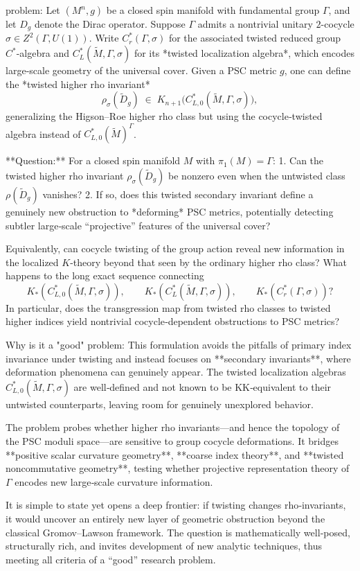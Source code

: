 problem:  
Let \( (M^n,g) \) be a closed spin manifold with fundamental group \( \Gamma \), and let \( D_g \) denote the Dirac operator. Suppose \( \Gamma \) admits a nontrivial unitary \( 2 \)-cocycle \( \sigma \in Z^2(\Gamma,U(1)) \). Write \( C^*_r(\Gamma,\sigma) \) for the associated twisted reduced group \( C^*\)-algebra and \( C^*_L(\widetilde M,\Gamma,\sigma) \) for its *twisted localization algebra*, which encodes large‑scale geometry of the universal cover.  
Given a PSC metric \(g\), one can define the *twisted higher rho invariant*  
\[
\rho_\sigma(\widetilde D_g) \;\in\; K_{n+1}\big(C^*_{L,0}(\widetilde M,\Gamma,\sigma)\big),
\]
generalizing the Higson–Roe higher rho class but using the cocycle‑twisted algebra instead of \( C^*_{L,0}(\widetilde M)^\Gamma \).  

**Question:**  
For a closed spin manifold \(M\) with \(\pi_1(M)=\Gamma\):
1. Can the twisted higher rho invariant \(\rho_\sigma(\widetilde D_g)\) be nonzero even when the untwisted class \(\rho(\widetilde D_g)\) vanishes?  
2. If so, does this twisted secondary invariant define a genuinely new obstruction to *deforming* PSC metrics, potentially detecting subtler large‑scale “projective” features of the universal cover?  

Equivalently, can cocycle twisting of the group action reveal new information in the localized \(K\)-theory beyond that seen by the ordinary higher rho class? What happens to the long exact sequence connecting  
\[
K_{*}(C^*_{L,0}(\widetilde M,\Gamma,\sigma)), \qquad
K_{*}(C^*_{L}(\widetilde M,\Gamma,\sigma)), \qquad
K_*(C^*_r(\Gamma,\sigma))?
\]  
In particular, does the transgression map from twisted rho classes to twisted higher indices yield nontrivial cocycle‑dependent obstructions to PSC metrics?

Why is it a "good" problem:  
This formulation avoids the pitfalls of primary index invariance under twisting and instead focuses on **secondary invariants**, where deformation phenomena can genuinely appear. The twisted localization algebras \( C^*_{L,0}(\widetilde M,\Gamma,\sigma) \) are well‑defined and not known to be KK‑equivalent to their untwisted counterparts, leaving room for genuinely unexplored behavior.  

The problem probes whether higher rho invariants—and hence the topology of the PSC moduli space—are sensitive to group cocycle deformations. It bridges **positive scalar curvature geometry**, **coarse index theory**, and **twisted noncommutative geometry**, testing whether projective representation theory of \( \Gamma \) encodes new large‑scale curvature information.  

It is simple to state yet opens a deep frontier: if twisting changes rho‑invariants, it would uncover an entirely new layer of geometric obstruction beyond the classical Gromov–Lawson framework. The question is mathematically well‑posed, structurally rich, and invites development of new analytic techniques, thus meeting all criteria of a “good” research problem.